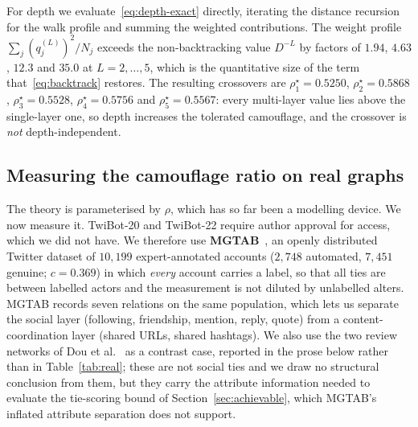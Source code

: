 \documentclass[../elsevier.tex]{subfiles}
\begin{document}
For depth we evaluate~\eqref{eq:depth-exact} directly, iterating the
distance recursion for the walk profile and summing the weighted contributions. The weight profile $\sum_j (q^{(L)}_j)^2/N_j$ exceeds the
non-backtracking value $D^{-L}$ by factors of $1.94$, $4.63$, $12.3$ and $35.0$ at
$L = 2,\dots,5$, which is the quantitative size of the term
that~\eqref{eq:backtrack} restores. The resulting crossovers are
$\rho^\star_1 = 0.5250$, $\rho^\star_2 = 0.5868$, $\rho^\star_3 = 0.5528$,
$\rho^\star_4 = 0.5756$ and $\rho^\star_5 = 0.5567$: every multi-layer value lies
above the single-layer one, so depth increases the tolerated camouflage, and the
crossover is \emph{not} depth-independent.

\subsection{Measuring the camouflage ratio on real graphs}
\label{sec:measuring}

The theory is parameterised by $\rho$, which has so far been a modelling device. We
now measure it. TwiBot-20 and TwiBot-22 require author approval for access, which we
did not have. We therefore use \textbf{MGTAB}~\citeyearpar{shi2023mgtab}, an openly
distributed Twitter dataset of $10{,}199$ expert-annotated accounts
($2{,}748$ automated, $7{,}451$ genuine; $c = 0.369$) in which \emph{every} account
carries a label, so that all ties are between labelled actors and the measurement is
not diluted by unlabelled alters. MGTAB records seven relations on the same
population, which lets us separate the social layer (following, friendship, mention,
reply, quote) from a content-coordination layer (shared URLs, shared hashtags). We also use the
two review networks of Dou et al.~\citeyearpar{dou2020caregnn} as a contrast case,
reported in the prose below rather than in Table~\ref{tab:real}; these are not social
ties and we draw no structural conclusion from them, but they carry the attribute
information needed to evaluate the tie-scoring bound of
Section~\ref{sec:achievable}, which MGTAB's inflated attribute separation does not
support.
\end{document}
